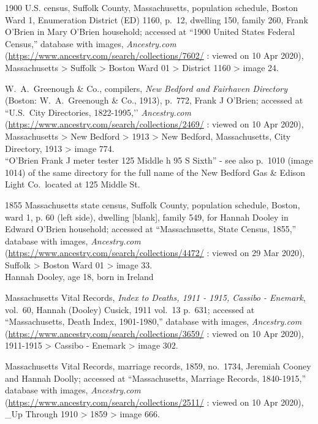 \begin{thebibliography}{999}
	1900 U.S. census, Suffolk County, Massachusetts, population schedule, Boston Ward 1, Enumeration District (ED) 1160, p.\ 12, dwelling 150, family 260, Frank O'Brien in Mary O'Brien household; accessed at ``1900 United States Federal Census,'' database with images, \textit{Ancestry.com} (\url{https://www.ancestry.com/search/collections/7602/} : viewed on 10 Apr 2020), Massachusetts > Suffolk > Boston Ward 01 > District 1160 > image 24.
	
	W.\ A.\ Greenough \& Co., compilers, \textit{New Bedford and Fairhaven Directory} (Boston: W.\ A.\ Greenough \& Co., 1913), p.\ 772, Frank J O'Brien; accessed at ``U.S.\ City Directories, 1822-1995,’’ \textit{Ancestry.com} (\url{https://www.ancestry.com/search/collections/2469/} : viewed on 10 Apr 2020), Massachusetts > New Bedford > 1913 > New Bedford, Massachusetts, City Directory, 1913 > image 774.\\
	``O'Brien Frank J meter tester 125 Middle h 95 S Sixth'' - see also p.\ 1010 (image 1014) of the same directory for the full name of the New Bedford Gas \& Edison Light Co.\ located at 125 Middle St.
	
	1855 Massachusetts state census, Suffolk County, population schedule, Boston, ward 1, p. 60 (left side), dwelling [blank], family 549, for Hannah Dooley in Edward O'Brien household; accessed at ``Massachusetts, State Census, 1855,'' database with images, \textit{Ancestry.com} (\url{https://www.ancestry.com/search/collections/4472/} : viewed on 29 Mar 2020), Suffolk > Boston Ward 01 > image 33.\\
	Hannah Dooley, age 18, born in Ireland
	
	Massachusetts Vital Records, \textit{Index to Deaths, 1911 - 1915, Cassibo - Enemark}, vol.\ 60, Hannah (Dooley) Cusick, 1911 vol.\ 13 p.\ 631; accessed at ``Massachusetts, Death Index, 1901-1980,'' database with images, \textit{Ancestry.com} (\url{https://www.ancestry.com/search/collections/3659/} : viewed on 10 Apr 2020), 1911-1915 > Cassibo - Enemark > image 302.
	
	Massachusetts Vital Records, marriage records, 1859, no.\ 1734, Jeremiah Cooney and Hannah Doolly; accessed at ``Massachusetts, Marriage Records, 1840-1915,'' database with images, \textit{Ancestry.com} (\url{https://www.ancestry.com/search/collections/2511/} : viewed on 10 Apr 2020), \_Up Through 1910 > 1859 > image 666.
	

\end{thebibliography}
